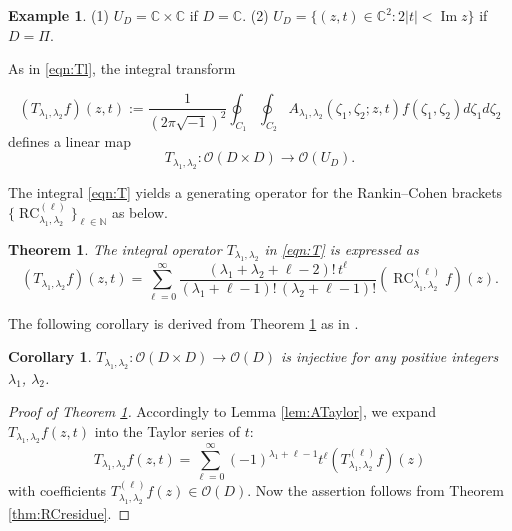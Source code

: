 \documentclass[12pt]{amsart}
\newcommand{\RC}{\operatorname{RC}}
\theoremstyle{plain} %
\newtheorem{theorem}{Theorem}
\newtheorem{corollary}{Corollary} %
\theoremstyle{definition} %
\newtheorem{example}{Example} %
\theoremstyle{remark} %
\begin{document}
\begin{example}
\label{ex:UD}
{\rm{(1)}}\enspace
$U_D={\mathbb{C}} \times {\mathbb{C}}$
 if $D={\mathbb{C}}$.  
\newline
{\rm{(2)}}\enspace
$U_D=
  \{(z, t) \in {\mathbb{C}}^2: 2|t|<\operatorname{Im} z\}
$
if $D=\Pi$.  
\end{example}

As in \eqref{eqn:Tl}, 
 the integral transform 

\begin{equation}
\label{eqn:T}
 (T_{\lambda_1, \lambda_2}f)(z, t)
:=
  \frac 1 {(2 \pi \sqrt{-1})^2}
  \oint_{C_1} \oint_{C_2}
  A_{\lambda_1, \lambda_2}(\zeta_1, \zeta_2; z, t)
  f(\zeta_1, \zeta_2) d \zeta_1 d \zeta_2
\end{equation}
 defines a linear map
\begin{equation*}
   T_{\lambda_1, \lambda_2} \colon 
  {\mathcal{O}}(D \times D) \to {\mathcal{O}}(U_D).  
\end{equation*}



The integral \eqref{eqn:T} yields a generating operator
 for the Rankin--Cohen brackets
 $\{\RC_{\lambda_1, \lambda_2}^{(\ell)}\}_{\ell \in {\mathbb{N}}}$
 as below.  

\begin{theorem}
\label{thm:23122033}
The integral operator $T_{\lambda_1, \lambda_2}$ in \eqref{eqn:T}
 is expressed as 
\begin{equation}
\label{eqn:TRC}
   (T_{\lambda_1, \lambda_2}f)(z, t)
=
  \sum_{\ell=0}^{\infty}
  \frac {(\lambda_1 + \lambda_2 + \ell -2) ! \, t^{\ell}}
        {(\lambda_1+\ell-1) ! \, (\lambda_2 + \ell -1)!}
(\RC_{\lambda_1, \lambda_2}^{(\ell)} f)(z).  
\end{equation}
\end{theorem}

The following corollary is derived from Theorem \ref{thm:23122033}
 as in \cite{KPgen}.  

\begin{corollary}
$T_{\lambda_1, \lambda_2} \colon {\mathcal{O}}(D \times D)
 \to {\mathcal{O}}(D)$
 is injective for any positive integers $\lambda_1$, $\lambda_2$.  
\end{corollary}

\begin{proof}
[Proof of Theorem \ref{thm:23122033}]
Accordingly to Lemma \ref{lem:ATaylor}, 
 we expand $T_{\lambda_1, \lambda_2}f(z,t)$ into the Taylor series of $t$:
\[
   T_{\lambda_1, \lambda_2}f(z,t)
  =\sum_{\ell=0}^{\infty} (-1)^{\lambda_1+\ell-1} t^{\ell} (T_{\lambda_1, \lambda_2}^{(\ell)}f)(z)
\]
with coefficients $T_{\lambda_1, \lambda_2}^{(\ell)}f(z) \in {\mathcal{O}}(D)$.
Now the assertion follows from Theorem \ref{thm:RCresidue}.  
\end{proof}
\end{document}
